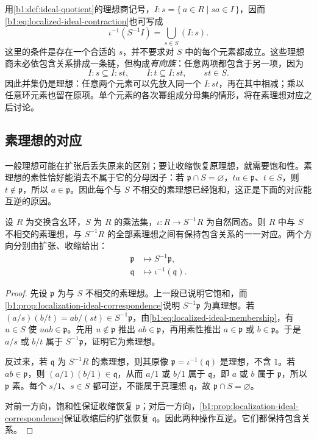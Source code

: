 \ProseParagraphBreak
用\cref{b1:def:ideal-quotient}的理想商记号，\(I:s=\{\,a\in R\mid sa\in I\,\}\)，因而\eqref{b1:eq:localized-ideal-contraction}也可写成
\begin{equation}\label{b1:eq:saturation-colon-union}
	\iota^{-1}(S^{-1}I)=\bigcup_{s\in S}(I:s).
\end{equation}
这里的条件是存在一个合适的 \(s\)，并不要求对 \(S\) 中的每个元素都成立。这些理想商未必依包含关系排成一条链，但构成\emph{有向族}：任意两项都包含于另一项，因为
\[
	I:s\subseteq I:st,\qquad I:t\subseteq I:st,\qquad st\in S.
\]
因此并集仍是理想：任意两个元素可以先放入同一个 \(I:st\)，再在其中相减；乘以任意环元素也留在原项。单个元素的各次幂组成分母集的情形，将在素理想对应之后讨论。

\subsection{素理想的对应}
\label{b1:subsec:1304:02}

一般理想可能在扩张后丢失原来的区别；要让收缩恢复原理想，就需要饱和性。素理想的素性恰好能消去不属于它的分母因子：若 \(\mathfrak p\cap S=\varnothing\)，\(ta\in\mathfrak p\)、\(t\in S\)，则 \(t\notin\mathfrak p\)，所以 \(a\in\mathfrak p\)。因此每个与 \(S\) 不相交的素理想已经饱和，这正是下面的对应能互逆的原因。

\begin{theorem}\label{b1:thm:localization-prime-correspondence}
	设 \(R\) 为交换含幺环，\(S\) 为 \(R\) 的乘法集，\(\iota:R\rightarrow S^{-1}R\) 为自然同态。则 \(R\) 中与 \(S\) 不相交的素理想，与 \(S^{-1}R\) 的全部素理想之间有保持包含关系的一一对应。两个方向分别由扩张、收缩给出：
	\[
		\begin{aligned}
			\mathfrak p&\longmapsto S^{-1}\mathfrak p,\\
			\mathfrak q&\longmapsto\iota^{-1}(\mathfrak q).
		\end{aligned}
	\]
\end{theorem}
\begin{proof}
	先设 \(\mathfrak p\) 为与 \(S\) 不相交的素理想。上一段已说明它饱和，而\cref{b1:prop:localization-ideal-correspondence}说明 \(S^{-1}\mathfrak p\) 为真理想。若 \((a/s)(b/t)=ab/(st)\in S^{-1}\mathfrak p\)，由\eqref{b1:eq:localized-ideal-membership}，有 \(u\in S\) 使 \(uab\in\mathfrak p\)。先用 \(u\notin\mathfrak p\) 推出 \(ab\in\mathfrak p\)，再用素性推出 \(a\in\mathfrak p\) 或 \(b\in\mathfrak p\)。于是 \(a/s\) 或 \(b/t\) 属于 \(S^{-1}\mathfrak p\)，证明它为素理想。

	反过来，若 \(\mathfrak q\) 为 \(S^{-1}R\) 的素理想，则其原像 \(\mathfrak p=\iota^{-1}(\mathfrak q)\) 是理想，不含 \(1\)。若 \(ab\in\mathfrak p\)，则 \((a/1)(b/1)\in\mathfrak q\)，从而 \(a/1\) 或 \(b/1\) 属于 \(\mathfrak q\)，即 \(a\) 或 \(b\) 属于 \(\mathfrak p\)，所以 \(\mathfrak p\) 素。每个 \(s/1\)、\(s\in S\) 都可逆，不能属于真理想 \(\mathfrak q\)，故 \(\mathfrak p\cap S=\varnothing\)。

	对前一方向，饱和性保证收缩恢复 \(\mathfrak p\)；对后一方向，\cref{b1:prop:localization-ideal-correspondence}保证收缩后的扩张恢复 \(\mathfrak q\)。因此两种操作互逆。它们都保持包含关系。
\end{proof}

